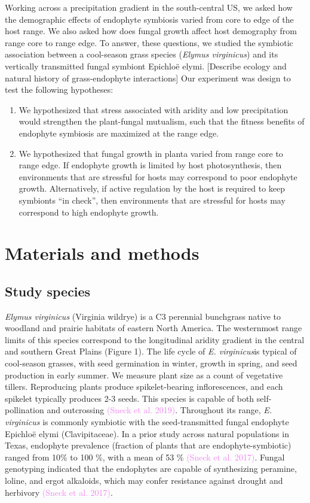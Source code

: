 \documentclass[11pt]{article}
\begin{document}
Working across a precipitation gradient in the south-central US, we asked how the demographic effects of endophyte symbiosis varied from core to edge of the host range.
We also asked how does fungal growth affect host demography from range core to range edge. 
To answer, these questions, we studied the symbiotic association between a cool-season grass species (\emph{Elymus virginicus}) and its vertically transmitted fungal symbiont Epichloë elymi. [Describe ecology and natural history of grass-endophyte interactions]
Our experiment was design to test the following hypotheses:
\begin{enumerate}
\item We hypothesized that stress associated with aridity and low precipitation would strengthen the plant-fungal mutualism, such that the fitness benefits of endophyte symbiosis are maximized at the range edge. 
\item We hypothesized that fungal growth in planta varied from range core to range edge. If endophyte growth is limited by host photosynthesis, then environments that are stressful for hosts may correspond to poor endophyte growth. Alternatively, if active regulation by the host is required to keep symbionts “in check”, then environments that are stressful for hosts may correspond to high endophyte growth.
\end{enumerate}

\section*{Materials and methods}

\subsection*{Study species}
\emph {Elymus virginicus} (Virginia wildrye) is a C3 perennial bunchgrass native to woodland and prairie habitats of eastern North America. 
The westernmost range limits of this species correspond to the longitudinal aridity gradient in the central and southern Great Plains (Figure 1). 
The life cycle of \emph{E. virginicus}is typical of cool-season grasses, with seed germination in winter, growth in spring, and seed production in early summer. 
We measure plant size as a count of vegetative tillers. Reproducing plants produce spikelet-bearing inflorescences, and each spikelet typically produces 2-3 seeds. 
This species is capable of both self-pollination and outcrossing \textcolor{violet}{(Sneck et al. 2019)}. 
Throughout its range, \emph {E. virginicus} is commonly symbiotic with the seed-transmitted fungal endophyte Epichloë elymi (Clavipitaceae). 
In a prior study across natural populations in Texas, endophyte prevalence (fraction of plants that are endophyte-symbiotic) ranged from 10\% to 100 \%, with a mean of 53 \% \textcolor{violet}{(Sneck et al. 2017)}. 
Fungal genotyping indicated that the endophytes are capable of synthesizing peramine, loline, and ergot alkaloids, which may confer resistance against drought and herbivory \textcolor{violet}{(Sneck et al. 2017)}.
\end{document}
